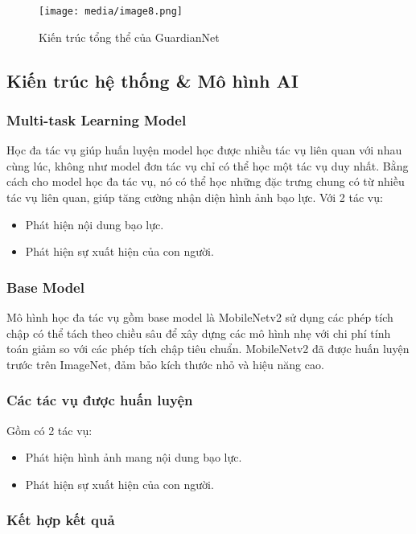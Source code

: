 \documentclass[12pt,a4paper]{article}
\begin{document}
\begin{figure}[H]
  \centering
  \texttt{[image: media/image8.png]}
  \caption{Kiến trúc tổng thể của GuardianNet}
\end{figure}

\subsection{Kiến trúc hệ thống \& Mô hình AI}

\subsubsection{Multi-task Learning Model}

Học đa tác vụ giúp huấn luyện model học được nhiều tác vụ liên quan với nhau cùng lúc, không như model đơn tác vụ chỉ có thể học một tác vụ duy nhất. Bằng cách cho model học đa tác vụ, nó có thể học những đặc trưng chung có từ nhiều tác vụ liên quan, giúp tăng cường nhận diện hình ảnh bạo lực. Với 2 tác vụ:

\begin{itemize}
  \item Phát hiện nội dung bạo lực.
  \item Phát hiện sự xuất hiện của con người.
\end{itemize}

\subsubsection{Base Model} 

Mô hình học đa tác vụ gồm base model là MobileNetv2 sử dụng các phép tích chập có thể tách theo chiều sâu để xây dựng các mô hình nhẹ với chi phí tính toán giảm so với các phép tích chập tiêu chuẩn. MobileNetv2 đã được huấn luyện trước trên ImageNet, đảm bảo kích thước nhỏ và hiệu năng cao.

\subsubsection{Các tác vụ được huấn luyện}

Gồm có 2 tác vụ:
\begin{itemize}
  \item Phát hiện hình ảnh mang nội dung bạo lực.
  \item Phát hiện sự xuất hiện của con người.
\end{itemize}

\subsubsection{Kết hợp kết quả} 
\end{document}
